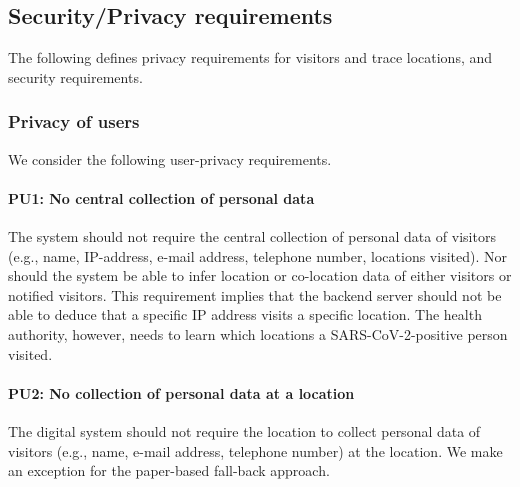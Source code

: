 \subsection{Security/Privacy requirements}
\label{sec:security-privacy-requirements}
The following defines privacy requirements for visitors and trace locations, and security requirements.

\subsubsection{Privacy of users}
We consider the following user-privacy requirements.

\paragraph{PU1: No central collection of personal data} The system should not require the central collection of personal data of visitors (e.g., name, IP-address, e-mail address, telephone number, locations visited). Nor should the system be able to infer location or co-location data of either visitors or notified visitors. This requirement implies that the backend server should not be able to deduce that a specific IP address visits a specific location. The health authority, however, needs to learn which locations a SARS-CoV-2-positive person visited.

\paragraph{PU2: No collection of personal data at a location} The digital system should not require the location to collect personal data of visitors (e.g., name, e-mail address, telephone number) at the location. We make an exception for the paper-based fall-back approach.

